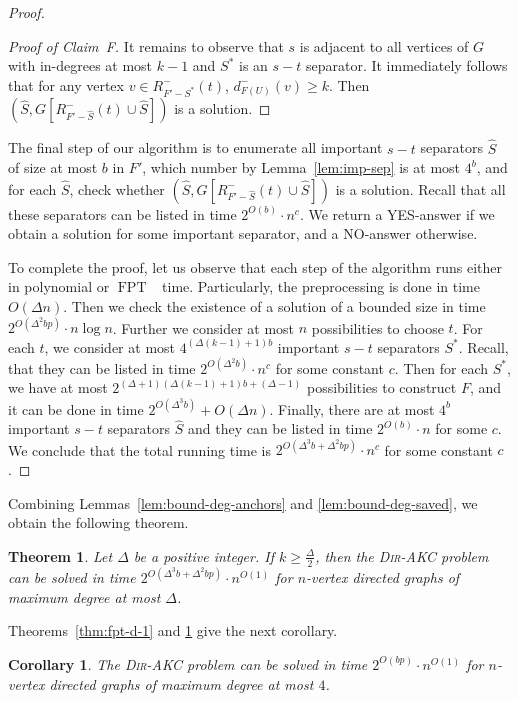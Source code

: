 \documentclass[11pt,a4paper]{article}
\newtheorem{theorem}{Theorem}
\newtheorem{corollary}{Corollary}
\DeclareMathOperator{\operatorClassFPT}{FPT}
\newcommand{\classFPT}{\ensuremath{\operatorClassFPT}}
\newcommand{\DAKC}{\textsc{Dir-AKC}\xspace}
\begin{document}
\begin{proof}
\begin{proof}[Proof of Claim~F]
It remains to observe that $s$ is adjacent to all vertices of $G$ with in-degrees at most $k-1$ and $S^*$ is an $s-t$
separator. It immediately follows that for any  vertex $v\in R_{F'-S^*}^-(t)$, $d_{F(U)}^-(v)\geq k$. Then
$(\hat{S},G[R_{F'-\hat{S}}^-(t)\cup \hat{S}])$ is a solution.
\end{proof}

The final step of our algorithm is to enumerate all important $s-t$ separators $\hat{S}$ of size at most $b$ in $F'$, which
number by Lemma~\ref{lem:imp-sep} is at most $4^b$, and for each $\hat{S}$, check whether $(\hat{S},G[R_{F'-\hat{S}}^-(t)\cup
\hat{S}])$ is a solution. Recall that all these separators can be listed in time $2^{O(b)}\cdot n^c$. We return a YES-answer
if we obtain a solution for some important separator, and a NO-answer otherwise.

To complete the proof, let us observe that each step of the algorithm runs either in polynomial or \classFPT~ time.
Particularly, the preprocessing is done in time $O(\Delta n)$. Then we check the existence of a solution of a bounded size in
time $2^{O(\Delta^2 bp)}\cdot n\log n$. Further we consider at most $n$ possibilities to choose $t$. For each $t$, we consider
at most $4^{(\Delta(k-1)+1)b}$ important $s-t$ separators $S^*$. Recall, that they can be listed in time
$2^{O(\Delta^2b)}\cdot n^c$ for some constant $c$. Then for each $S^*$, we have  at most  $2^{(\Delta+1)
(\Delta(k-1)+1)b+(\Delta-1)}$ possibilities to construct $F$, and it can be done in time $2^{O(\Delta^3b)}+O(\Delta n)$.
Finally, there are at most $4^b$ important $s-t$ separators $\hat{S}$ and they can be listed in time $2^{O(b)}\cdot n$ for
some $c$. We conclude that the total running time is $2^{O(\Delta^3b+\Delta^2bp)}\cdot n^c$ for some constant $c$.
\end{proof}

Combining Lemmas~\ref{lem:bound-deg-anchors} and \ref{lem:bound-deg-saved}, we obtain the following theorem.

\begin{theorem}\label{thm:bound-deg}
Let $\Delta$ be a positive integer. If $k\geq \frac{\Delta}{2}$, then the \DAKC problem can be solved in time $2^{O(\Delta^3
b+ \Delta^2 b p)}\cdot n^{O(1)}$ for $n$-vertex directed graphs of maximum degree at most $\Delta$.
\end{theorem}

Theorems~\ref{thm:fpt-d-1} and \ref{thm:bound-deg} give the next corollary.

\begin{corollary}\label{cor:fpt-delta}
The \DAKC problem can be solved in time $2^{O(bp)}\cdot n^{O(1)}$  for $n$-vertex directed graphs of maximum degree at most
$4$.
\end{corollary}
\end{document}
